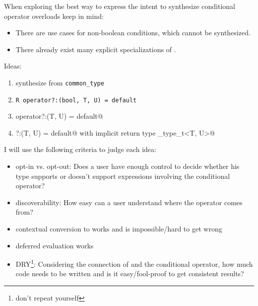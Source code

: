 When exploring the best way to express the intent to synthesize conditional operator overloads keep in mind:
\begin{itemize}
\item There are use cases for non-boolean conditions, which cannot be synthesized.
\item There already exist many explicit specializations of .
\end{itemize}

Ideas:
\begin{enumerate}
\item synthesize from \lstinline{common_type}
\item \lstinline[style=Vc]@R operator?:(bool, T, U) = default@
\item \lstinline@R operator?:(T, U) = default@
\item \lstinline@operator?:(T, U) = default@ with implicit return type \lstinline@common_type_t<T, U>@
\end{enumerate}

I will use the following criteria to judge each idea:
\begin{itemize}
\item opt-in vs. opt-out: Does a user have enough control to decide whether his type supports or doesn't support expressions involving the conditional operator?
\item discoverability: How easy can a \CC{} user understand where the operator comes from?
\item contextual conversion to \bool works and is impossible/hard to get wrong
\item deferred evaluation works
\item DRY\footnote{don't repeat yourself}: Considering the connection of  and the conditional operator, how much code needs to be written and is it easy/fool-proof to get consistent results?
\end{itemize}

\newcommand\good{\color[rgb]{0,.4,.2}\ding{52} }
\newcommand\bad{\color[rgb]{.5,0,0}\ding{56} }
\newcommand\undecided{\color[rgb]{.4,.4,0}\textbf{?} }
\newcommand\greatnesstable[5]{
\begin{tabular}{p{.2\textwidth}|p{.7\textwidth}}
criteria & result \\
\hline
opt-in vs. opt-out &\noindent #1 \\
discoverability &\noindent #2 \\
contextual \bool &\noindent #3 \\
deferred eval &\noindent #4 \\
DRY &\noindent #5 \\
\end{tabular}
}

